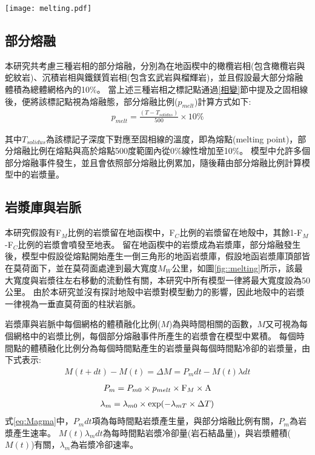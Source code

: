 \begin{figure*}[ht]
    \centering
    \texttt{[image: melting.pdf]}
    \caption[模型內岩漿作用示意圖。]{模型內岩漿作用示意圖。圖中繪製兩個不同的部分熔融事件。每個獨立部分熔融事件會對應獨立的岩漿庫。
    模型中有F$_M$比例的岩漿留在地函楔中，F$_C$比例的岩漿留在地殼中，其餘1-F$_M$-F$_C$比例的岩漿會噴發至地表形成火山島弧，如圖上方紅紫色三角形。
    地函岩漿庫中的岩漿均勻分布在地函楔中紅橘色倒三角形。
    圖中假設部分熔融事件二的部分熔融體積為a$_2$地函岩漿庫體積為A$_{M2}$。
    }
    \label{fig::melting}
\end{figure*}

\subsection{部分熔融}\label{部分熔融}
本研究共考慮三種岩相的部分熔融，分別為在地函楔中的橄欖岩相(包含橄欖岩與蛇紋岩)、沉積岩相與鐵鎂質岩相(包含玄武岩與榴輝岩)，並且假設最大部分熔融體積為總體網格內的10$\%$。
當上述三種岩相之標記點通過\ref{相變}節中提及之固相線後，便將該標記點視為熔融態，部分熔融比例($p_{melt}$)計算方式如下:
\begin{align}
    p_{melt}=\frac{(T-T_{solidus})}{500}\times 10\% \label{eq:melting}
\end{align}

其中$T_{solidus}$為該標記子深度下對應至固相線的溫度，即為熔點(melting point)，部分熔融比例在熔點與高於熔點500度範圍內從0$\%$線性增加至10$\%$。
模型中允許多個部分熔融事件發生，並且會依照部分熔融比例累加，隨後藉由部分熔融比例計算模型中的岩漿量。

\subsection{岩漿庫與岩脈}\label{岩漿庫}
本研究假設有F$_M$比例的岩漿留在地函楔中，F$_C$比例的岩漿留在地殼中，其餘1-F$_M$-F$_C$比例的岩漿會噴發至地表。
留在地函楔中的岩漿成為岩漿庫，部分熔融發生後，模型中假設從熔點開始產生一倒三角形的地函岩漿庫，假設地函岩漿庫頂部皆在莫荷面下，並在莫荷面處達到最大寬度$M_W$公里，如圖\ref{fig::melting}所示，該最大寬度與岩漿往左右移動的流動性有關，本研究中所有模型一律將最大寬度設為50公里。
由於本研究並沒有探討地殼中岩漿對模型動力的影響，因此地殼中的岩漿一律視為一垂直莫荷面的柱狀岩脈。

岩漿庫與岩脈中每個網格的體積融化比例($M$)為與時間相關的函數，$M$又可視為每個網格中的岩漿比例，每個部分熔融事件所產生的岩漿會在模型中累積。
每個時間點的體積融化比例分為每個時間點產生的岩漿量與每個時間點冷卻的岩漿量，由下式表示:
\begin{align}
    M(t+dt)-M(t) = \Delta M = P_m dt-M(t)\lambda dt \label{eq:Magma}
\end{align}
\begin{align}
    P_m = P_{m0} \times p_{melt} \times {\rm F}_M \times {\rm A} \label{eq:Magma P}
\end{align}
\begin{align}
    \lambda_m = \lambda_{m0}\times {\rm exp}(-\lambda_{mT} \times \Delta T) \label{eq:Magma lambda}
\end{align}
式\ref{eq:Magma}中，$P_m dt$項為每時間點岩漿產生量，與部分熔融比例有關，$P_m$為岩漿產生速率。
$M(t)\lambda_m dt$為每時間點岩漿冷卻量(岩石結晶量)，與岩漿體積($M(t)$)有關，$\lambda_m$為岩漿冷卻速率。

